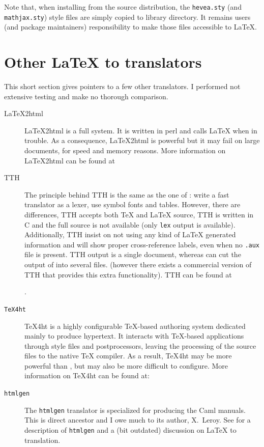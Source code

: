 \label{installsty}Note that, when installing \hevea{} from the source distribution, the
\texttt{hevea.sty} (and \texttt{mathjax.sty}) style files are
simply copied to \hevea{} library directory.
It remains users (and package maintainers) responsibility to make those
files accessible to \LaTeX.

\section{Other \LaTeX{} to \html{} translators}
This short section gives pointers to a few other translators. I
performed not extensive testing and make no thorough comparison.

\begin{description}
\item[LaTeX2html]
LaTeX2html is a full system. It is written in perl and
calls \LaTeX{} when in trouble.
As a consequence, LaTeX2html is powerful but it may fail on
large documents, for speed and memory reasons.
More information on LaTeX2html can be found at
\begin{center}
\end{center}

\item[TTH] The principle behind TTH is the same as the one of
\hevea{}: write a fast translator as a lexer, use symbol fonts and
tables. However, there are differences, TTH accepts both \TeX{} and
\LaTeX{} source, 
TTH is written in C and the full source is not available
(only \verb+lex+ output is available).
Additionally, TTH  insist on not using any kind of \LaTeX{}
generated information and will show proper cross-reference labels,
even when no \texttt{.aux} file is present.
TTH output is a single document,
whereas \hacha{} can cut the output of \hevea{} into several files.
(however there exists a commercial
version of TTH that provides this extra functionality).
TTH can be found at
\begin{center}
.
\end{center}

\item[\texttt{TeX4ht}]
TeX4ht is a highly configurable TeX-based authoring system dedicated
mainly to produce hypertext.
It interacts with TeX-based applications through style files
and postprocessors, leaving the processing of the source files
to the native TeX compiler. As a result, TeX4ht may be more powerful
than \hevea{}, but may also be more difficult to configure.
More information on TeX4ht can be found at:
\begin{center}
\end{center}
\item[\texttt{htmlgen}] The \texttt{htmlgen} translator is specialized
for producing the Caml manuals. This is \hevea{} direct ancestor and I
owe much to its author, X.~Leroy. See \cite{htmlgen} for a description
of \texttt{htmlgen} and a (bit outdated) discussion on \LaTeX{} to
\html{} translation.
\end{description}

